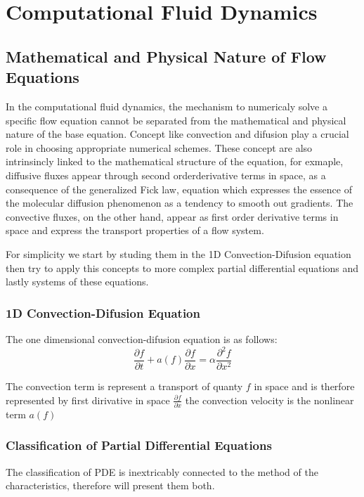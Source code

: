 \chapter{Computational Fluid Dynamics}



\section{Mathematical and Physical Nature of Flow Equations}
In the computational fluid dynamics, the mechanism to numericaly solve a
specific flow equation cannot be separated from the mathematical and
physical nature of the base equation. 
Concept like convection and difusion play a crucial role in choosing appropriate
numerical schemes. These concept are also intrinsincly linked to the
mathematical structure of the equation, for exmaple, diffusive fluxes appear through second orderderivative terms in space, as a consequence of the generalized Fick law, equation which expresses 
the essence of the molecular diffusion phenomenon as a tendency to smooth out gradients. 
The convective fluxes, on the other hand, appear as first order derivative terms in space and 
express the transport properties of a flow system.

For simplicity we start by studing them in the 1D Convection-Difusion equation then try to apply this concepts 
to more complex partial differential equations and lastly systems of these equations.


\subsection{1D Convection-Difusion Equation}
The one dimensional convection-difusion equation is as follows:
\begin{equation}
	\frac{\partial f}{\partial t} + a(f) \frac{\partial f}{\partial x} = \alpha \frac{\partial^2 f}{\partial x^2}
\end{equation}

The convection term is represent a transport of quanty $f$ in space and is therfore represented by first dirivative in space $\frac{\partial f}{\partial x}$ the convection velocity is the nonlinear term $a(f)$




\subsection{Classification of Partial Differential Equations}
The classification of PDE is inextricably connected to the method of the characteristics, 
therefore will present them both.






















